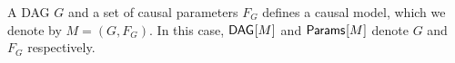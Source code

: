 A DAG $G$ and a set of causal parameters $F_G$ defines a causal model, which we denote by $M = (G,F_G)$. In this case,
 ${\operatorname{\mathsf{DAG}}_{}}\lbrack M\rbrack$ and ${\operatorname{\mathsf{Params}}_{}}\lbrack M\rbrack$ denote $G$ and $F_G$ respectively.



